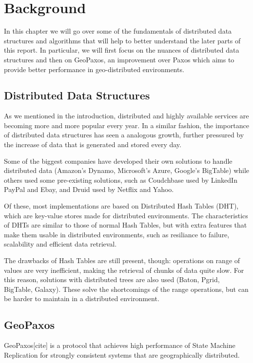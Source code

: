 \chapter{Background}\label{sec:Background}
In this chapter we will go over some of the fundamentals of distributed data structures and algorithms that will help to better understand the later parts of this report. In particular, we will first focus on the nuances of distributed data structures and then on  GeoPaxos, an improvement over Paxos which aims to provide better performance in geo-distributed environments.

\section{Distributed Data Structures}\label{sec:distributed-data-structures}
As we mentioned in the introduction, distributed and highly available services are becoming more and more popular every year. In a similar fashion, the importance of distributed data structures has seen a analogous growth, further pressured by the increase of data that is generated and stored every day. 

Some of the biggest companies have developed their own solutions to handle distributed data (Amazon's Dynamo, Microsoft's Azure, Google's BigTable) while others used some pre-existing solutions, such as Coudchbase used by LinkedIn PayPal and Ebay, and Druid used by Netflix and Yahoo.

Of these, most implementations are based on Distributed Hash Tables (DHT), which are key-value stores made for distributed environments. 
The characteristics of DHTs are similar to those of normal Hash Tables, but with extra features that make them usable in distributed environments, such as resiliance to failure, scalability and efficient data retrieval.

The drawbacks of Hash Tables are still present, though: operations on range of values are very inefficient, making the retrieval of chunks of data quite slow. For this reason, solutions with distributed trees are also used (Baton, Pgrid, BigTable, Galaxy). These solve the shortcomings of the range operations, but can be harder to maintain in a distributed environment.

\section{GeoPaxos}\label{sec:GeoPaxos}
GeoPaxos[cite] is a protocol that achieves high performance of State Machine Replication for strongly consistent systems that are geographically distributed. 

